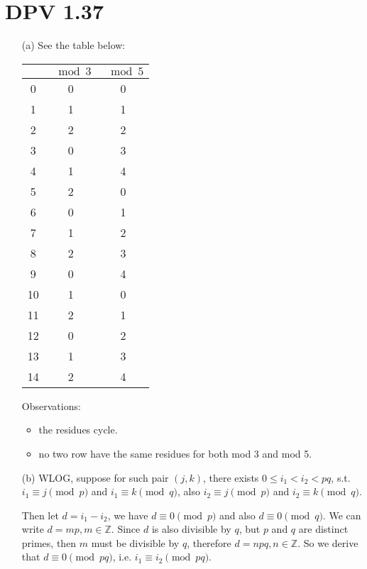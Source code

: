 \documentclass[twoside]{homework}
\begin{document}
\section{DPV 1.37}
\begin{enumerate}
	\item [(a)] See the table below:
	\begin{table}[h!]
		\centering
		\begin{tabular}{|c|c|c|}
		\hline
		 & $\mod 3$ & $\mod 5$\\ \hline \hline
		 0 & 0 & 0 \\ \hline
		 1 & 1 & 1\\ \hline
		 2 & 2 & 2\\ \hline
		 3 & 0 & 3\\ \hline
		 4 & 1 & 4\\ \hline
		 5 & 2 & 0\\ \hline
		 6 & 0 & 1\\ \hline
		 7 & 1 & 2\\ \hline
		 8 & 2 & 3\\ \hline
		 9 & 0 & 4\\ \hline
		 10 & 1& 0\\ \hline
		 11 & 2& 1\\ \hline
		 12 & 0& 2\\ \hline
		 13 & 1& 3\\ \hline
		 14 & 2& 4\\ \hline
		\end{tabular}
		\end{table}

		Observations:
		\begin{itemize}
			\item the residues cycle.
			\item no two row have the same residues for both mod 3 and mod 5.
		\end{itemize}

	\item [(b)] WLOG, suppose for such pair $(j, k)$, there exists $0 \leq i_1 < i_2 < pq$, s.t. $i_1 \equiv j \pmod p$ and $i_1 \equiv k \pmod q$, also $i_2 \equiv j \pmod p$ and $i_2 \equiv k \pmod q$.

	Then let $d = i_1 - i_2$, we have $d \equiv 0 \pmod p$ and also $d \equiv 0 \pmod q$. We can write $d = mp, m \in \mathbb{Z}$. Since $d$ is also divisible by $q$, but $p$ and $q$ are distinct primes, then $m$ must be divisible by $q$, therefore $d = npq, n \in \mathbb{Z}$. So we derive that $d \equiv 0 \pmod {pq}$, i.e. $i_1 \equiv i_2 \pmod {pq}$.


\end{enumerate}
\end{document}
